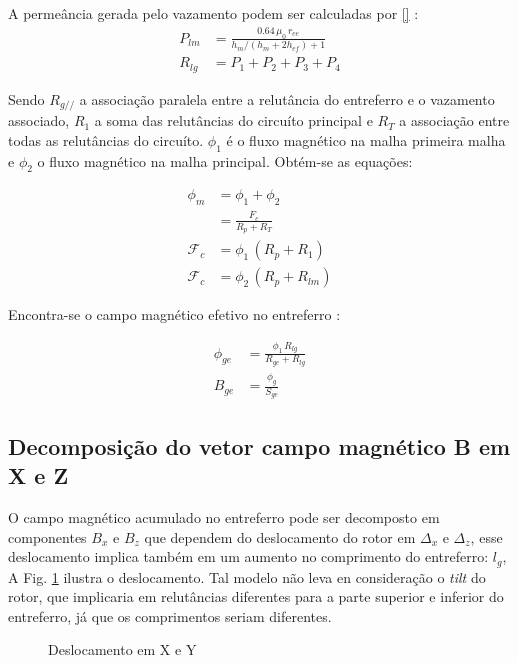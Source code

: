 A permeância gerada pelo vazamento podem ser calculadas por \ref{}  : 
\begin{align}
	P_{lm} &= \frac{0.64 \,  \mu_0 \,r_{ee}}{h_m/(h_m+2h_{ef})+1} \\
	R_{lg} &= P_1 + P_2 + P_3 + P_4	
\end{align} 

Sendo $R_{g//}$ a associação paralela entre a relutância do entreferro e o vazamento associado, $R_1$ a soma das relutâncias do circuíto principal e $R_T$ a associação entre todas as relutâncias do circuíto. $\phi_1$ é o fluxo magnético na malha primeira malha e $\phi_2$ o fluxo magnético na malha principal. Obtém-se as equações:

\begin{align}
	\phi_m &= \phi_1 + \phi_2 \\
				 &= \frac{F_c}{R_p + R_T} \\
	\mathcal{F}_c	 &= \phi_1 \, (R_p + R_1) \\
	\mathcal{F}_c    &= \phi_2 \, (R_p + R_{lm})
\end{align}

Encontra-se o campo magnético efetivo no entreferro :

\begin{align}
   \phi_{ge} &= \frac{\phi_1 \, R_{lg}}{R_{ge}+R_{lg}} \\
   B_{ge} &= \frac{\phi_g}{S_{ge}}
\end{align}


\subsection{Decomposição do vetor campo magnético B em X e Z} \label{SubSec:CampoX/Y}

O campo magnético acumulado no entreferro pode ser decomposto em componentes $B_x$ e $B_z$ que dependem do deslocamento do rotor em $\Delta_x$ e $\Delta_z$, esse deslocamento implica também em um aumento no comprimento do entreferro: $l_g$, A Fig. \ref{Fig:modelo:passivo:DxDz} ilustra o deslocamento. Tal modelo não leva en consideração o \textit{tilt} do rotor, que implicaria em relutâncias diferentes para a parte superior e inferior do entreferro, já que os comprimentos seriam diferentes. 

	\begin{figure}[!ht]
		\centering
		\def\svgwidth{0.6\columnwidth}
		
			\caption{Deslocamento em X e Y}
			\label{Fig:modelo:passivo:DxDz}
	\end{figure}

